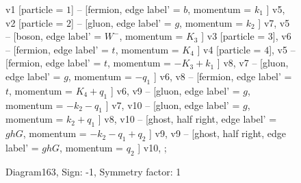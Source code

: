 \documentclass{revtex4}
\begin{document}
\begin{figure}[!htb]
\begin{center}
{    %
v1 [particle = \(1\)] -- [fermion, edge label' = \(b\), momentum = \(k_{1}\) ] v5, 
v2 [particle = \(2\)] -- [gluon, edge label' = \(g\), momentum = \(k_{2}\) ] v7, 
v5 -- [boson, edge label' = \(W^{-}\), momentum = \(K_{3}\) ] v3 [particle = \(3\)], 
v6 -- [fermion, edge label' = \(t\), momentum = \(K_{4}\) ] v4 [particle = \(4\)], 
v5 -- [fermion, edge label' = \(t\), momentum = \(-K_{3} + k_{1}\) ] v8, 
v7 -- [gluon, edge label' = \(g\), momentum = \(-q_{1}\) ] v6, 
v8 -- [fermion, edge label' = \(t\), momentum = \(K_{4} + q_{1}\) ] v6, 
v9 -- [gluon, edge label' = \(g\), momentum = \(-k_{2} - q_{1}\) ] v7, 
v10 -- [gluon, edge label' = \(g\), momentum = \(k_{2} + q_{1}\) ] v8, 
v10 -- [ghost, half right, edge label' = \(ghG\), momentum = \(-k_{2} - q_{1} + q_{2}\) ] v9, 
v9 -- [ghost, half right, edge label' = \(ghG\), momentum = \(q_{2}\) ] v10, 
};
\end{center}
\caption{Diagram163, Sign: -1, Symmetry factor: 1}
\end{figure}
\newpage
\end{document}
